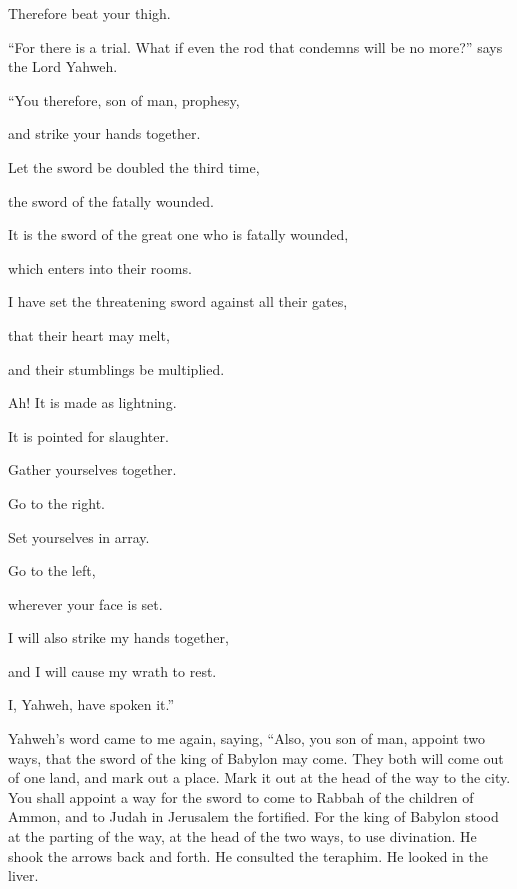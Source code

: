 {\par }{\QB Therefore beat your thigh.
\par }{\BB \par }{\PP {}“For there is a trial. What if even the rod that condemns will be no more?” says the Lord Yahweh.
\par }{\Q {}“You therefore, son of man, prophesy,
\par }{\QB and strike your hands together.
\par }{\Q Let the sword be doubled the third time,
\par }{\QB the sword of the fatally wounded.
\par }{\Q It is the sword of the great one who is fatally wounded,
\par }{\QB which enters into their rooms.
\par }{\Q {}I have set the threatening sword against all their gates,
\par }{\QB that their heart may melt,
\par }{\QB and their stumblings be multiplied.
\par }{\Q Ah! It is made as lightning.
\par }{\QB It is pointed for slaughter.
\par }{\Q {}Gather yourselves together.
\par }{\QB Go to the right.
\par }{\Q Set yourselves in array.
\par }{\QB Go to the left,
\par }{\QB wherever your face is set.
\par }{\Q {}I will also strike my hands together,
\par }{\QB and I will cause my wrath to rest.
\par }{\QB I, Yahweh, have spoken it.”
\par }{\PP {}Yahweh’s word came to me again, saying,
“Also, you son of man, appoint two ways, that the sword of the king of Babylon may come. They both will come out of one land, and mark out a place. Mark it out at the head of the way to the city.
You shall appoint a way for the sword to come to Rabbah of the children of Ammon, and to Judah in Jerusalem the fortified.
For the king of Babylon stood at the parting of the way, at the head of the two ways, to use divination. He shook the arrows back and forth. He consulted the teraphim. He looked in the liver.
}
